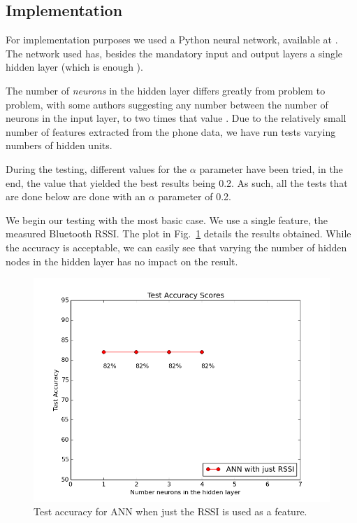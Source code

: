 \subsection{Implementation}

For implementation purposes we used a Python neural network, available at \cite{issam}. The network used has, besides the mandatory input and output layers a single hidden layer (which is enough \cite{Hornik1989359,Hartman,cybenko}). 

The number of \textit{neurons} in the hidden layer differs greatly from problem to problem, with some authors suggesting any number between the number of neurons in the input layer, to two times that value \cite{Stathakis}. Due to the relatively small number of features extracted from the phone data, we have run tests varying numbers of hidden units. 

During the testing, different values for the $\alpha$ parameter have been tried, in the end, the value that yielded the best results being 0.2. As such, all the tests that are done below are done with an $\alpha$ parameter of 0.2.

We begin our testing with the most basic case. We use a single feature, the measured Bluetooth RSSI. The plot in Fig.~\ref{pic:ann_single} details the results obtained. While the accuracy is acceptable, we can easily see that varying the number of hidden nodes in the hidden layer has no impact on the result. 

\begin{figure}[h]
	\begin{center}
		\includegraphics[scale=0.6]{figures/ann_simple.png}
	\end{center}
	
	\caption{Test accuracy for ANN when just the RSSI is used as a feature.}
	\label{pic:ann_single}

\end{figure}

